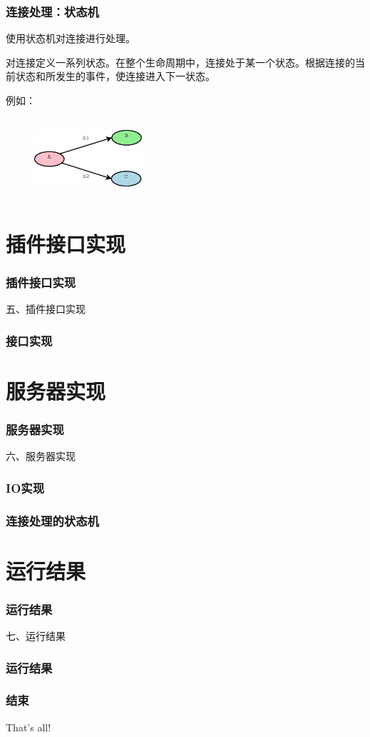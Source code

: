 \documentclass[10pt,dvipdfm]{beamer}
\begin{document}
\begin{frame}
	\frametitle{连接处理：状态机}
	使用状态机对连接进行处理。
	
	对连接定义一系列状态。在整个生命周期中，连接处于某一个状态。根据连接的当前状态和所发生的事件，使连接进入下一状态。
	
	\pause
	
	\begin{example}{例如：}
		\begin{figure}[htbp]
	\centering
	\includegraphics[height=3cm, width=4cm]{statemachine.eps}
	\end{figure}
	\end{example}
\end{frame}

\section{插件接口实现}

\begin{frame}
	\frametitle{插件接口实现}
	\begin{center}
	{\Large
		五、插件接口实现
	}
	\end{center}
\end{frame}

\begin{frame}
	\frametitle{接口实现}
\end{frame}

\section{服务器实现}

\begin{frame}
	\frametitle{服务器实现}
	\begin{center}
	{\Large
		六、服务器实现
	}
	\end{center}
\end{frame}

\begin{frame}
	\frametitle{IO实现}
\end{frame}

\begin{frame}
	\frametitle{连接处理的状态机}
\end{frame}

\section{运行结果}

\begin{frame}
	\frametitle{运行结果}
	\begin{center}
	{\Large
		七、运行结果
	}
	\end{center}
\end{frame}

\begin{frame}
	\frametitle{运行结果}
\end{frame}

\begin{frame}
	\frametitle{结束}
	\begin{center}
	{\Huge
		That's all!
	}
	\end{center}
\end{frame}
\end{document}
